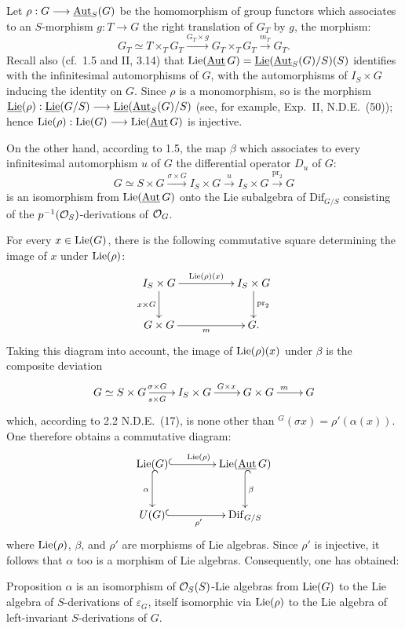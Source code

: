 Let $\rho:G\longrightarrow\underline{\operatorname{Aut}}_S(G)$ be the homomorphism of group functors which associates to an $S$-morphism $g:T\to G$ the right translation of $G_T$ by $g$, \ie the morphism:
\[
G_T\simeq T\times_T G_T\xrightarrow{G_T\times g}G_T\times_TG_T\xrightarrow{m_T}G_T.
\]
Recall also (cf.\ 1.5 and II, 3.14) that $\operatorname{Lie}(\underline{\operatorname{Aut}}\,G)=\underline{\operatorname{Lie}}(\underline{\operatorname{Aut}}_S(G)/S)(S)$ identifies with the infinitesimal automorphisms of $G$, \ie with the automorphisms of $I_S\times G$ inducing the identity on $G$. Since $\rho$ is a monomorphism, so is the morphism $\underline{\operatorname{Lie}}(\rho):\underline{\operatorname{Lie}}(G/S)\longrightarrow\underline{\operatorname{Lie}}(\underline{\operatorname{Aut}}_S(G)/S)$ (see, for example, Exp.\ II, N.D.E.\ (50)); hence $\operatorname{Lie}(\rho):\operatorname{Lie}(G)\longrightarrow\operatorname{Lie}(\underline{\operatorname{Aut}}\,G)$ is injective.

On the other hand, according to 1.5, the map $\beta$ which associates to every infinitesimal automorphism $u$ of $G$ the differential operator $D_u$ of $G$:
\[
G\simeq S\times G\xrightarrow{\sigma\times G}I_S\times G\xrightarrow{u}I_S\times G\xrightarrow{\mathrm{pr}_2}G
\]
is an isomorphism from $\operatorname{Lie}(\underline{\operatorname{Aut}}\,G)$ onto the Lie subalgebra of $\mathrm{Dif}_{G/S}$ consisting of the $p^{-1}(\mathcal{O}_S)$-derivations of $\mathcal{O}_G$.

For every $x\in\operatorname{Lie}(G)$, there is the following commutative square determining the image of $x$ under $\operatorname{Lie}(\rho)$:
\[
\xymatrix@C=5em{I_S\times G\ar[r]^{\Lie(\rho)(x)}\ar[d]_{x\times G}&I_S\times G\ar[d]^{\mathrm{pr}_2}\\
G\times G\ar[r]_m&G.}
\]
Taking this diagram into account, the image of $\operatorname{Lie}(\rho)(x)$ under $\beta$ is the composite deviation
\[
\xymatrix@C=2.3em{G\simeq S\times G\ar[r]^{\sigma\times G}_{s\times G}&I_S\times G\ar[r]^{G\times x}&G\times G\ar[r]^m&G}
\]
which, according to 2.2 N.D.E.\ (17), is none other than ${}^G(\sigma x)=\rho'(\alpha(x))$. One therefore obtains a commutative diagram:
\[
\xymatrix@C=4em@R=3em{\Lie(G)\ar@{^{(}->}[r]^{\Lie(\rho)}\ar@{^{(}->}[d]_\alpha&\Lie(\underline{\Aut}\,G)\ar@{^{(}->}[d]^\beta\\
U(G)\ar@{^{(}->}[r]_{\rho'}&\mathrm{Dif}_{G/S}}
\]
where $\operatorname{Lie}(\rho)$, $\beta$, and $\rho'$ are morphisms of Lie algebras. Since $\rho'$ is injective, it follows that $\alpha$ too is a morphism of Lie algebras. Consequently, one has obtained:

\begin{enonce}{Proposition}{}
$\alpha$ is an isomorphism of $\mathcal{O}_S(S)$-Lie algebras from $\operatorname{Lie}(G)$ to the Lie algebra of $S$-derivations of $\varepsilon_G$, itself isomorphic via $\operatorname{Lie}(\rho)$ to the Lie algebra of left-invariant $S$-derivations of $G$.
\end{enonce}

